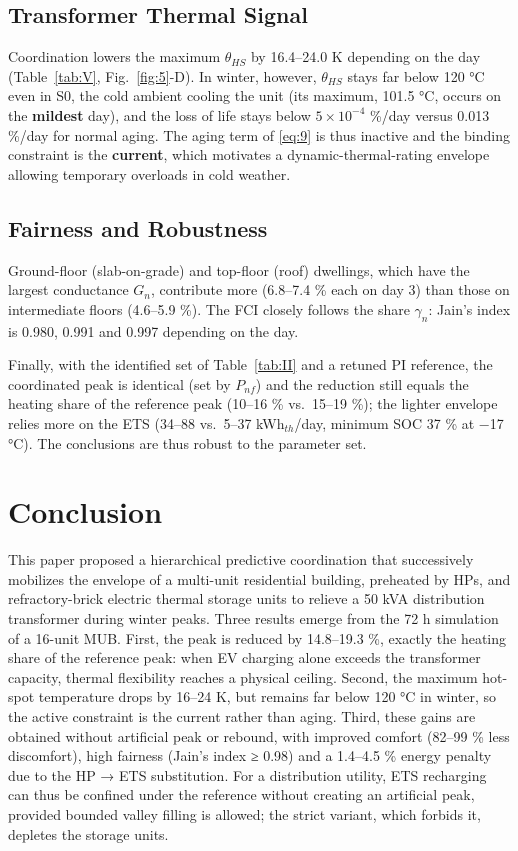 \documentclass[conference]{IEEEtran}
\begin{document}
\subsection{Transformer Thermal Signal}

Coordination lowers the maximum \(\theta_{HS}\) by 16.4--24.0 K depending on the day (Table~\ref{tab:V}, Fig.~\ref{fig:5}-D). In winter, however, \(\theta_{HS}\) stays far below 120 °C even in S0, the cold ambient cooling the unit (its maximum, 101.5 °C, occurs on the \textbf{mildest} day), and the loss of life stays below \(5\times10^{-4}\) \%/day versus 0.013 \%/day for normal aging. The aging term of \eqref{eq:9} is thus inactive and the binding constraint is the \textbf{current}, which motivates a dynamic-thermal-rating envelope allowing temporary overloads in cold weather.

\subsection{Fairness and Robustness}

Ground-floor (slab-on-grade) and top-floor (roof) dwellings, which have the largest conductance \(G_n\), contribute more (6.8--7.4 \% each on day 3) than those on intermediate floors (4.6--5.9 \%). The FCI closely follows the share \(\gamma_n\): Jain's index is 0.980, 0.991 and 0.997 depending on the day.

Finally, with the identified set of Table~\ref{tab:II} and a retuned PI reference, the coordinated peak is identical (set by \(P_{nf}\)) and the reduction still equals the heating share of the reference peak (10--16 \% vs.~15--19 \%); the lighter envelope relies more on the ETS (34--88 vs.~5--37 kWh\(_{th}\)/day, minimum SOC 37 \% at −17 °C). The conclusions are thus robust to the parameter set.

\section{\textbf{Conclusion}}

This paper proposed a hierarchical predictive coordination that successively mobilizes the envelope of a multi-unit residential building, preheated by HPs, and refractory-brick electric thermal storage units to relieve a 50 kVA distribution transformer during winter peaks. Three results emerge from the 72 h simulation of a 16-unit MUB. First, the peak is reduced by 14.8--19.3 \%, exactly the heating share of the reference peak: when EV charging alone exceeds the transformer capacity, thermal flexibility reaches a physical ceiling. Second, the maximum hot-spot temperature drops by 16--24 K, but remains far below 120 °C in winter, so the active constraint is the current rather than aging. Third, these gains are obtained without artificial peak or rebound, with improved comfort (82--99 \% less discomfort), high fairness (Jain's index ≥ 0.98) and a 1.4--4.5 \% energy penalty due to the HP → ETS substitution. For a distribution utility, ETS recharging can thus be confined under the reference without creating an artificial peak, provided bounded valley filling is allowed; the strict variant, which forbids it, depletes the storage units.
\end{document}
